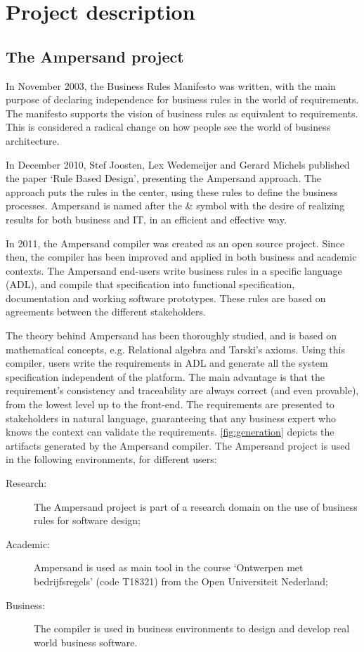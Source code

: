 \section{Project description}
\label{sec:project-description}

\subsection{The Ampersand project}
In November 2003, the Business Rules Manifesto \cite{business-rules} was written, with the main purpose of declaring independence for business rules in the world of requirements.
The manifesto supports the vision of business rules as equivalent to requirements.
This is considered a radical change on how people see the world of business architecture.

In December 2010, Stef Joosten, Lex Wedemeijer and Gerard Michels published the paper `Rule Based Design', presenting the Ampersand approach.
The approach puts the rules in the center, using these rules to define the business processes.
Ampersand is named after the \& symbol with the desire of realizing results for both business and IT, in an efficient and effective way.

In 2011, the Ampersand compiler was created as an open source project.
Since then, the compiler has been improved and applied in both business and academic contexts.
The Ampersand end-users write business rules in a specific language (ADL), and compile that specification into functional specification, documentation and working software prototypes.
%
These rules are based on agreements between the different stakeholders.

The theory behind Ampersand has been thoroughly studied, and is based on mathe\-matical concepts, e.g. Relational algebra and Tarski's axioms.
Using this compiler, users write the requirements in ADL and generate all the system specification independent of the platform.
The main advantage is that the requirement's consistency and traceability are always correct (and even provable), from the lowest level up to the front-end.
The requirements are presented to stakeholders in natural language, guaranteeing that any business expert who knows the context can validate the requirements.
\autoref{fig:generation} depicts the artifacts generated by the Ampersand compiler.
%
The Ampersand project is used in the following environments, for different users:
\begin{description}
	\item[Research:] The Ampersand project is part of a research domain on the use of business rules for software design;
	\item[Academic:] Ampersand is used as main tool in the course `Ontwerpen met bedrijfsregels' (code T18321) from the Open Universiteit Nederland;
	\item[Business:] The compiler is used in business environments to design and develop real world business software.
\end{description}

